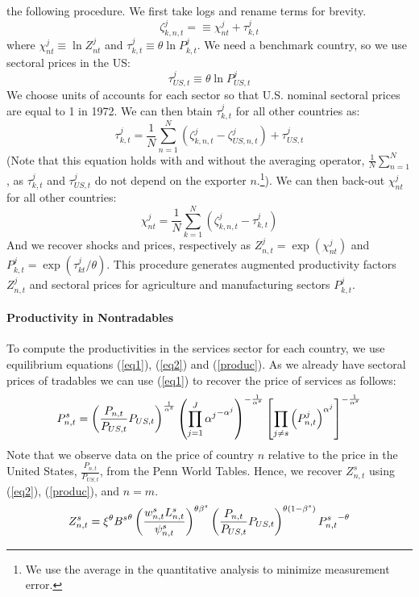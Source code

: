 \documentclass[12pt]{article}
\begin{document}
the following procedure. We first take logs and rename terms for brevity. 
\begin{equation}
\zeta _{k,n,t}^{j}=\equiv \chi _{nt}^{j}+\tau _{k,t}^{j}
\end{equation}%
where $\chi _{nt}^{j}\equiv \ln {Z_{nt}^{j}}$ and $\tau _{k,t}^{j}\equiv
\theta \ln {P_{k,t}^{j}}$. We need a benchmark country, so we use sectoral
prices in the US: 
\begin{equation*}
\tau _{US,t}^{j}\equiv \theta \ln {P_{US,t}^{j}}
\end{equation*}%
We choose units of accounts for each sector so that U.S. nominal sectoral
prices are equal to 1 in 1972. We can then btain $\tau _{k,t}^{j}$ for all
other countries as: 
\begin{equation}
\tau _{k,t}^{j}=\frac{1}{N}\sum_{n=1}^{N}\left( \zeta _{k,n,t}^{j}-\zeta
_{US,n,t}^{j}\right) +\tau _{US,t}^{j}
\end{equation}%
(Note that this equation holds with and without the averaging operator, $%
\frac{1}{N}\sum_{n=1}^{N}$, as $\tau _{k,t}^{j}$ and $\tau _{US,t}^{j}$ do
not depend on the exporter $n$.\footnote{%
We use the average in the quantitative analysis to minimize measurement
error.}). We can then back-out $\chi _{nt}^{j}$ for all other countries:%
\begin{equation}
\chi _{nt}^{j}=\frac{1}{N}\sum_{k=1}^{N}\left( \zeta _{k,n,t}^{j}-\tau
_{k,t}^{j}\right)
\end{equation}%
And we recover shocks and prices, respectively as $Z_{n,t}^{j}=\exp \left(
\chi _{nt}^{j}\right) $ and $P_{k,t}^{j}=\exp \left( \tau _{kt}^{j}/\theta
\right) .$ This procedure generates augmented productivity factors $%
Z_{n,t}^{j}$ and sectoral prices for agriculture and manufacturing sectors $%
P_{k,t}^{j}$.

\paragraph{Productivity in Nontradables}

To compute the productivities in the services sector for each country, we
use equilibrium equations (\ref{eq1}), (\ref{eq2}) and (\ref{produc}). As we
already have sectoral prices of tradables we can use (\ref{eq1}) to recover
the price of services as follows: 
\begin{equation}
P_{n,t}^{s}=\left( \frac{P_{n,t}}{P_{US,t}}P_{US,t}\right) ^{\frac{1}{\alpha
^{s}}}\left( \prod_{j=1}^{J}{\alpha ^{j}}^{-\alpha ^{j}}\right) ^{-\frac{1}{%
\alpha ^{s}}}\left[ \prod_{j\neq s}\left( P_{n,t}^{j}\right) ^{\alpha ^{j}}%
\right] ^{-\frac{1}{\alpha ^{s}}}
\end{equation}%
Note that we observe data on the price of country $n$ relative to the price
in the United States, $\frac{P_{n,t}}{P_{US,t}}$, from the Penn World
Tables. Hence, we recover $Z_{n,t}^{s}$ using (\ref{eq2}), (\ref{produc}),
and $n=m$. 
\begin{equation}
Z_{n,t}^{s}=\xi ^{\theta }{B^{s}}^{\theta }\left( \frac{%
w_{n,t}^{s}L_{n,t}^{s}}{\psi _{n,t}^{s}}\right) ^{\theta \beta ^{s}}\left( 
\frac{P_{n,t}}{P_{US,t}}P_{US,t}\right) ^{\theta (1-\beta ^{s})}{P_{n,t}^{s}}%
^{-\theta }
\end{equation}
\end{document}
